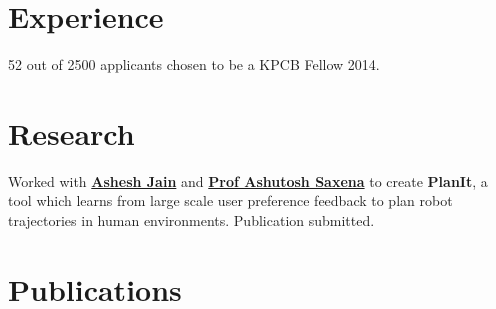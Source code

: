 \documentclass[]{deedy-resume-openfont}
\begin{document}
\hfill
\begin{minipage}[t]{0.66\textwidth} 


\section{Experience}

\vspace{\topsep} %
\begin{tightemize}\item 52 out of 2500 applicants chosen to be a KPCB Fellow 2014.
\end{tightemize}
\sectionsep


\section{Research}
Worked with \textbf{\href{http://www.cs.cornell.edu/~ashesh/}{Ashesh Jain}} and \textbf{\href{http://www.cs.cornell.edu/~asaxena/}{Prof Ashutosh Saxena}} to create \textbf{PlanIt}, a tool which  learns from large scale user preference feedback to plan robot trajectories in human environments.  Publication submitted.
\sectionsep


\section{Publications} 
\vspace*{0.8cm}
\renewcommand\refname{\vskip -1.5cm} %


\nocite{*}

\sectionsep



\end{minipage}
\end{document}
